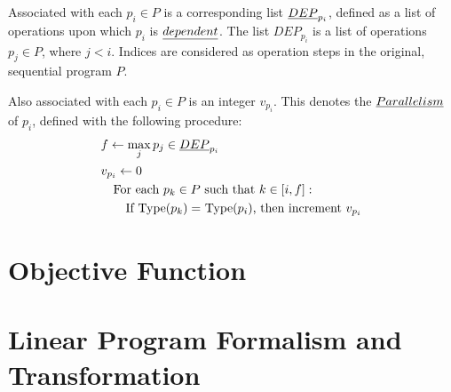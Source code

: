 \documentclass[12pt,twoside]{article}
\begin{document}
\begin{definition} Associated with each $p_i \in P$ is a corresponding list $\emph{DEP}_{p_i}$, defined as a list of operations upon which $p_i$ is $\emph{dependent}$. The list $DEP_{p_i}$ is a list of operations $p_j \in P$, where $j < i$. Indices are considered as operation steps in the original, sequential program $P$.
\end{definition}

\begin{definition} Also associated with each $p_i \in P$ is an integer $v_{p_i}$. This denotes the $\emph{Parallelism}$ of $p_i$, defined with the following procedure:
	\begin{align*}
		&f \leftarrow \max_{j} p_j \in \emph{DEP}_{p_i}\\
		&v_{p_i} \leftarrow 0\\ 
		&\ \ \text{ For each $p_k \in P$ such that $k \in [i,f]$}:\\
		&\quad\quad \text{If Type($p_k) = $ Type($p_i$), then increment $v_{p_i}$}
	\end{align*}
\end{definition}

\section{Objective Function}


\section{Linear Program Formalism and Transformation}
\end{document}
